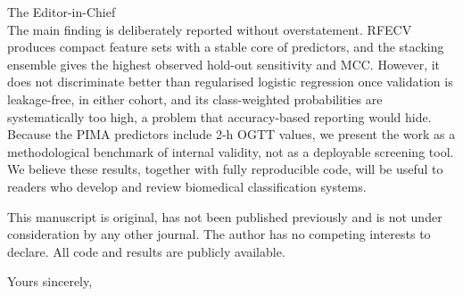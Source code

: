 \documentclass[11pt]{letter}
\begin{document}
\begin{letter}{The Editor-in-Chief\\\targetjournal}
The main finding is deliberately reported without overstatement. RFECV produces compact feature sets with a stable core of predictors, and the stacking ensemble gives the highest observed hold-out sensitivity and MCC. However, it does not discriminate better than regularised logistic regression once validation is leakage-free, in either cohort, and its class-weighted probabilities are systematically too high, a problem that accuracy-based reporting would hide. Because the PIMA predictors include 2-h OGTT values, we present the work as a methodological benchmark of internal validity, not as a deployable screening tool. We believe these results, together with fully reproducible code, will be useful to readers who develop and review biomedical classification systems.

This manuscript is original, has not been published previously and is not under consideration by any other journal. The author has no competing interests to declare. All code and results are publicly available.

\closing{Yours sincerely,}
\end{letter}
\end{document}

